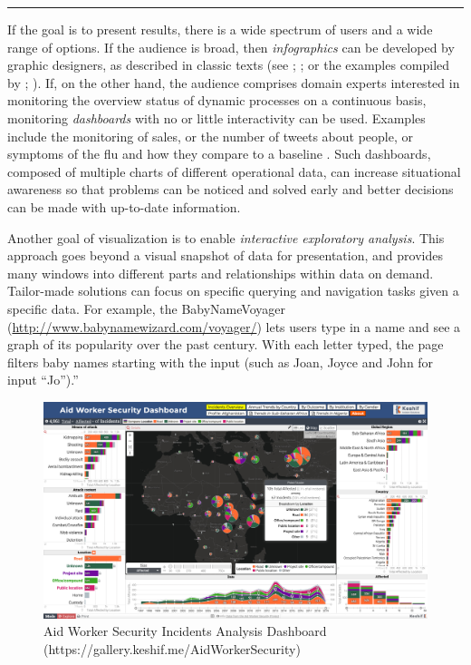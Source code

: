 \documentclass[]{krantz}
\begin{document}
\begin{center}\rule{0.5\linewidth}{\linethickness}\end{center}

If the goal is to present results, there is a wide spectrum of users and
a wide range of options. If the audience is broad, then
\emph{infographics} can be developed by graphic designers, as described
in classic texts (see \citet{few2009now}; \citet{edward2001visual};
\citet{edward2006beauty} or the examples compiled by
\citet{harrison2015infographic}; \citet{harrisonweb}). If, on the other
hand, the audience comprises domain experts interested in monitoring the
overview status of dynamic processes on a continuous basis, monitoring
\emph{dashboards} with no or little interactivity can be used. Examples
include the monitoring of sales, or the number of tweets about people,
or symptoms of the flu and how they compare to a baseline
\citep{few2013information}. Such dashboards, composed of multiple charts
of different operational data, can increase situational awareness so
that problems can be noticed and solved early and better decisions can
be made with up-to-date information.

Another goal of visualization is to enable \emph{interactive exploratory
analysis}. This approach goes beyond a visual snapshot of data for
presentation, and provides many windows into different parts and
relationships within data on demand. Tailor-made solutions can focus on
specific querying and navigation tasks given a specific data. For
example, the BabyNameVoyager
(\url{http://www.babynamewizard.com/voyager/}) lets users type in a name
and see a graph of its popularity over the past century. With each
letter typed, the page filters baby names starting with the input (such
as Joan, Joyce and John for input ``Jo'').''

\begin{figure}

{\centering \includegraphics[width=0.9\linewidth]{ChapterViz/figures/fig9-2a-new} 

}

\caption{Aid Worker Security Incidents Analysis Dashboard (https://gallery.keshif.me/AidWorkerSecurity)}\label{fig:fig9-2a}
\end{figure}
\end{document}
